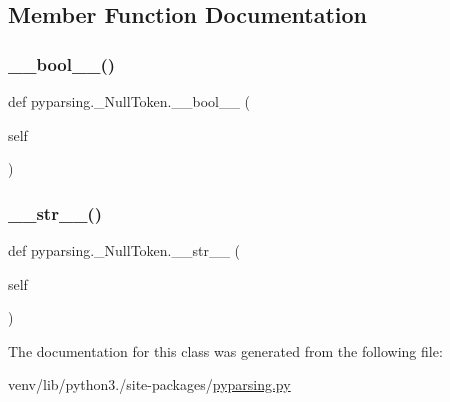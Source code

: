 \subsection{Member Function Documentation}
\mbox{\label{classpyparsing_1_1__NullToken_a4f8cbc8c4d7624e5157680a4355522ec}} 
\subsubsection{\texorpdfstring{\+\_\+\+\_\+bool\+\_\+\+\_\+()}{\_\_bool\_\_()}}
{\footnotesize\ttfamily def pyparsing.\+\_\+\+Null\+Token.\+\_\+\+\_\+bool\+\_\+\+\_\+ (\begin{DoxyParamCaption}\item[{}]{self }\end{DoxyParamCaption})}

\mbox{\label{classpyparsing_1_1__NullToken_a62f1ce32b50993a94119ef34c0f9dab1}} 
\subsubsection{\texorpdfstring{\+\_\+\+\_\+str\+\_\+\+\_\+()}{\_\_str\_\_()}}
{\footnotesize\ttfamily def pyparsing.\+\_\+\+Null\+Token.\+\_\+\+\_\+str\+\_\+\+\_\+ (\begin{DoxyParamCaption}\item[{}]{self }\end{DoxyParamCaption})}



The documentation for this class was generated from the following file\+:\begin{DoxyCompactItemize}
\item 
venv/lib/python3./site-\/packages/\hyperlink{pyparsing_8py}{pyparsing.\+py}\end{DoxyCompactItemize}
